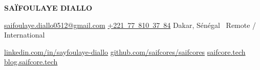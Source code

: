 \newcommand{\headlinemaster}{%
  Backend \& Architecture logicielle \textbullet\
  Syst\`emes distribu\'es \textbullet\
  Banque \& Paiements}

\newcommand{\headlinebackend}{%
  Java \textbullet\ Spring Boot \textbullet\
  Syst\`emes distribu\'es \textbullet\ Banque \& Paiements}

\newcommand{\headlinearchitecture}{%
  Architecture logicielle \textbullet\ Syst\`emes distribu\'es \textbullet\
  Plateformes d'entreprise}

\newcommand{\headlinefintech}{%
  Banque \textbullet\ Paiements \textbullet\
  Traitement de transactions \textbullet\ Infrastructure de paiement}

\newcommand{\headlineinternational}{%
  Backend \& syst\`emes distribu\'es \textbullet\ Remote}

\newcommand{\jobtitlemaster}{Ing\'enieur Backend Senior}
\newcommand{\jobtitlebackend}{Ing\'enieur Backend Senior}
\newcommand{\jobtitlearchitecture}{Ing\'enieur Backend Senior}
\newcommand{\jobtitlefintech}{Ing\'enieur Backend Senior}
\newcommand{\jobtitleinternational}{Ing\'enieur Backend Senior}

\begin{center}
    {\LARGE \textbf{SA\"IFOULAYE DIALLO}}

    \vspace{2pt}

    {\large {}}

    \vspace{1pt}

    {\small {}}

    \vspace{3pt}

    {\small
    \href{mailto:saifoulaye.diallo0512@gmail.com}{saifoulaye.diallo0512@gmail.com}
    \quad\textbar\quad
    \href{tel:+221778103784}{+221~77~810~37~84}
    \quad\textbar\quad
    Dakar, S\'en\'egal \textbullet\ Remote / International}

    \vspace{1pt}

    {\small
    \href{https://www.linkedin.com/in/sayfoulaye-diallo}{linkedin.com/in/sayfoulaye-diallo}
    \quad\textbar\quad
    \href{https://github.com/saifcores/saifcores}{github.com/saifcores/saifcores}
    \quad\textbar\quad
    \href{https://saifcore.tech}{saifcore.tech}
    \quad\textbar\quad
    \href{https://blog.saifcore.tech}{blog.saifcore.tech}}
\end{center}
